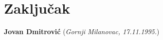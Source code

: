 \documentclass[12pt,oneside]{memoir}
\begin{document}
\chapter{Zaključak}

\literatura

\backmatter

\begin{biografija}
  \textbf{Jovan Dmitrović} (\emph{Gornji Milanovac, 17.11.1995.}) 
\end{biografija}
\end{document}
